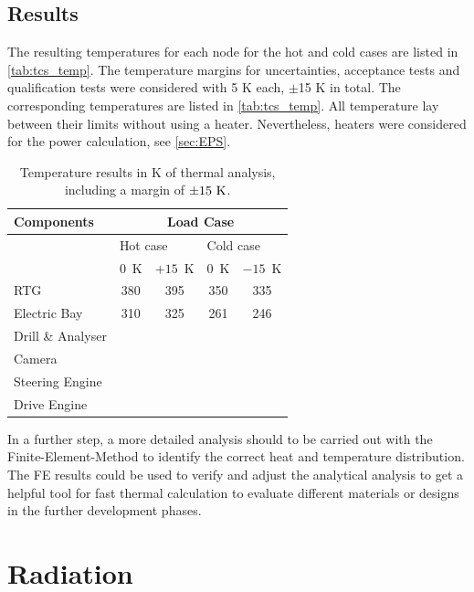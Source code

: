 \subsection{Results}
The resulting temperatures for each node for the hot and cold cases  are listed in \autoref{tab:tcs_temp}.
The temperature margins for uncertainties, acceptance tests and qualification tests were considered with 5 K each, $\pm$15 K in total.
The corresponding temperatures are listed in \autoref{tab:tcs_temp}.
All temperature lay between their limits without using a heater.
Nevertheless, heaters were considered for the power calculation, see \autoref{sec:EPS}.

\begin{table}[htb]
	\centering
	\caption{Temperature results in K of thermal analysis, including a margin of $\pm15\ {\rm K}$.}
	\begin{tabular}{l@{\qquad\qquad}cc@{\qquad}|@{\qquad}cc}
		\hline
		Components & \multicolumn{4}{c}{Load Case}   \\ \hline
		& \multicolumn{2}{l}{Hot case} & \multicolumn{2}{l}{Cold case} \\
		& $0$\ K & $+15$\ K & $0$\ K & $-15$\ K \\ \hline
		RTG  & 380 & 395 & 350 & 335   \\
		Electric Bay & 310 & 325 & 261 & 246  \\
		Drill \& Analyser & & & &  \\
		Camera & & & &  \\
		Steering Engine & & & &  \\
		Drive Engine & & & &  \\   \hline
	\end{tabular}
	\label{tab:tcs_temp}
\end{table}

In a further step, a more detailed analysis should to be carried out with the Finite-Element-Method to identify the correct heat and temperature distribution.
The FE results could be used to verify and adjust the analytical analysis to get a helpful tool for fast thermal calculation to evaluate different materials or designs in the further development phases.


\clearpage

\section{Radiation} \label{sec:Radiation}


